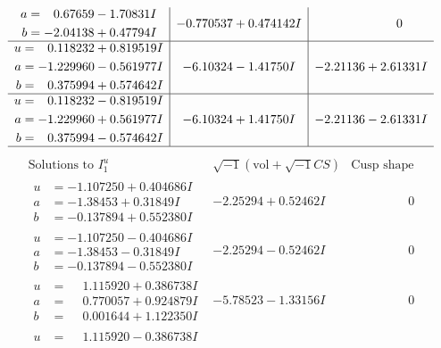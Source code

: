 \documentclass[1p]{elsarticle_modified}
\theoremstyle{definition}
\newcommand{\I}{\sqrt{-1}}
\begin{document}
$$\begin{array}{c|c|c}
\begin{aligned}
a &= \phantom{-}0.67659 - 1.70831 I \\
b &= -2.04138 + 0.47794 I\end{aligned}
 & -0.770537 + 0.474142 I & \phantom{-0.000000 } 0 \\ \hline\begin{aligned}
u &= \phantom{-}0.118232 + 0.819519 I \\
a &= -1.229960 - 0.561977 I \\
b &= \phantom{-}0.375994 + 0.574642 I\end{aligned}
 & -6.10324 - 1.41750 I & -2.21136 + 2.61331 I \\ \hline\begin{aligned}
u &= \phantom{-}0.118232 - 0.819519 I \\
a &= -1.229960 + 0.561977 I \\
b &= \phantom{-}0.375994 - 0.574642 I\end{aligned}
 & -6.10324 + 1.41750 I & -2.21136 - 2.61331 I\\
 \hline 
 \end{array}$$\newpage$$\begin{array}{c|c|c}  
\text{Solutions to }I^u_{1}& \I (\text{vol} + \sqrt{-1}CS) & \text{Cusp shape}\\
 \hline 
\begin{aligned}
u &= -1.107250 + 0.404686 I \\
a &= -1.38453 + 0.31849 I \\
b &= -0.137894 + 0.552380 I\end{aligned}
 & -2.25294 + 0.52462 I & \phantom{-0.000000 } 0 \\ \hline\begin{aligned}
u &= -1.107250 - 0.404686 I \\
a &= -1.38453 - 0.31849 I \\
b &= -0.137894 - 0.552380 I\end{aligned}
 & -2.25294 - 0.52462 I & \phantom{-0.000000 } 0 \\ \hline\begin{aligned}
u &= \phantom{-}1.115920 + 0.386738 I \\
a &= \phantom{-}0.770057 + 0.924879 I \\
b &= \phantom{-}0.001644 + 1.122350 I\end{aligned}
 & -5.78523 - 1.33156 I & \phantom{-0.000000 } 0 \\ \hline\begin{aligned}
u &= \phantom{-}1.115920 - 0.386738 I \\

\end{aligned}
\end{array}$$
\end{document}
